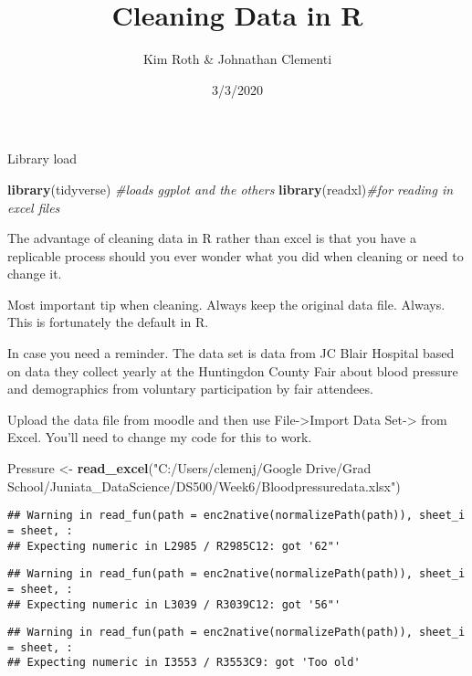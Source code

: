 \documentclass[
]{article}
\title{Cleaning Data in R}
\author{Kim Roth \& Johnathan Clementi}
\date{3/3/2020}
\newenvironment{Shaded}{\begin{snugshade}}{\end{snugshade}}
\newcommand{\CommentTok}[1]{\textcolor[rgb]{0.56,0.35,0.01}{\textit{#1}}}
\newcommand{\KeywordTok}[1]{\textcolor[rgb]{0.13,0.29,0.53}{\textbf{#1}}}
\newcommand{\NormalTok}[1]{#1}
\newcommand{\StringTok}[1]{\textcolor[rgb]{0.31,0.60,0.02}{#1}}
\begin{document}
\maketitle

Library load

\begin{Shaded}
\begin{Highlighting}[]
\KeywordTok{library}\NormalTok{(tidyverse) }\CommentTok{#loads ggplot and the others}
\KeywordTok{library}\NormalTok{(readxl)}\CommentTok{#for reading in excel files}
\end{Highlighting}
\end{Shaded}

The advantage of cleaning data in R rather than excel is that you have a
replicable process should you ever wonder what you did when cleaning or
need to change it.

Most important tip when cleaning. Always keep the original data file.
Always. This is fortunately the default in R.

In case you need a reminder. The data set is data from JC Blair Hospital
based on data they collect yearly at the Huntingdon County Fair about
blood pressure and demographics from voluntary participation by fair
attendees.

Upload the data file from moodle and then use File-\textgreater Import
Data Set-\textgreater{} from Excel. You'll need to change my code for
this to work.

\begin{Shaded}
\begin{Highlighting}[]
\NormalTok{Pressure <-}\StringTok{ }\KeywordTok{read_excel}\NormalTok{(}\StringTok{"C:/Users/clemenj/Google Drive/Grad School/Juniata_DataScience/DS500/Week6/Bloodpressuredata.xlsx"}\NormalTok{)}
\end{Highlighting}
\end{Shaded}

\begin{verbatim}
## Warning in read_fun(path = enc2native(normalizePath(path)), sheet_i = sheet, :
## Expecting numeric in L2985 / R2985C12: got '62"'
\end{verbatim}

\begin{verbatim}
## Warning in read_fun(path = enc2native(normalizePath(path)), sheet_i = sheet, :
## Expecting numeric in L3039 / R3039C12: got '56"'
\end{verbatim}

\begin{verbatim}
## Warning in read_fun(path = enc2native(normalizePath(path)), sheet_i = sheet, :
## Expecting numeric in I3553 / R3553C9: got 'Too old'
\end{verbatim}
\end{document}
